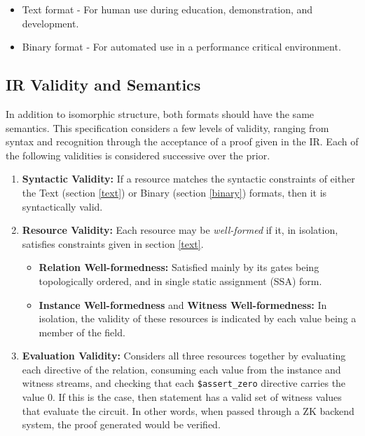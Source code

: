 \documentclass[12pt]{article}
\begin{document}
\begin{itemize}
  \item Text format - For human use during education, demonstration, and development.
  \item Binary format - For automated use in a performance critical environment.
\end{itemize}

\subsection{IR Validity and Semantics}\label{ir_validity}
In addition to isomorphic structure, both formats should have the same semantics.
This specification considers a few levels of validity, ranging from syntax and recognition through the acceptance of a proof given in the IR.
Each of the following validities is considered successive over the prior.

\begin{enumerate}
    \item \textbf{Syntactic Validity:} If a resource matches the syntactic constraints of either the Text (section \ref{text}) or Binary (section \ref{binary}) formats, then it is syntactically valid.\\
    \item \textbf{Resource Validity:} Each resource may be \textit{well-formed} if it, in isolation, satisfies constraints given in section \ref{text}.
    \begin{itemize}
        \item \textbf{Relation Well-formedness:} Satisfied mainly by its gates being topologically ordered, and in single static assignment (SSA) form.
        \item \textbf{Instance Well-formedness} and \textbf{Witness Well-formedness:} In isolation, the validity of these resources is indicated by each value being a member of the field.
    \end{itemize}
    \item \textbf{Evaluation Validity:} Considers all three resources together by evaluating each directive of the relation, consuming each value from the instance and witness streams, and checking that each \texttt{\$assert\_zero} directive carries the value $0$. If this is the case, then statement has a valid set of witness values that evaluate the circuit. In other words, when passed through a ZK backend system, the proof generated would be verified.
\end{enumerate}
\end{document}
